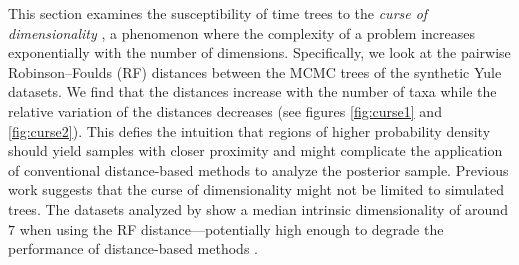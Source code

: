 \documentclass[10pt,letterpaper]{article}
\begin{document}
This section examines the susceptibility of time trees to the \emph{curse of dimensionality} \cite{curse,curse2}, a phenomenon where the complexity of a problem increases exponentially with the number of dimensions. Specifically, we look at the pairwise Robinson–Foulds (RF) distances between the MCMC trees of the synthetic Yule datasets. We find that the distances increase with the number of taxa while the relative variation of the distances decreases (see figures \ref{fig:curse1} and \ref{fig:curse2}). This defies the intuition that regions of higher probability density should yield samples with closer proximity and might complicate the application of conventional distance-based methods to analyze the posterior sample. Previous work suggests that the curse of dimensionality might not be limited to simulated trees. The datasets analyzed by \cite{dimensionality} show a median intrinsic dimensionality of around $7$ when using the RF distance---potentially high enough to degrade the performance of distance-based methods \cite{curseimplications}.
\end{document}

